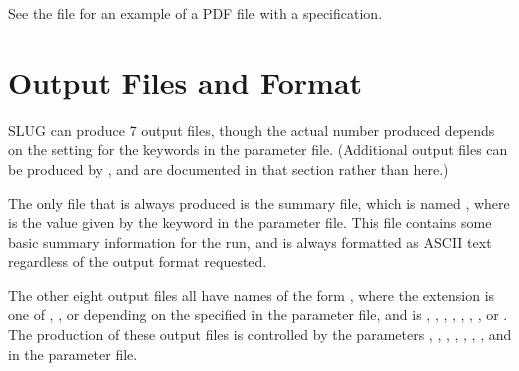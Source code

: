 \documentclass[letterpaper,10pt,english]{sphinxmanual}
\begin{document}
See the file  for an example of a PDF file with a  specification.


\chapter{Output Files and Format}
\label{\detokenize{output:output-files-and-format}}\label{\detokenize{output::doc}}\label{\detokenize{output:sec-output}}
SLUG can produce 7 output files, though the actual number produced depends on the setting for the  keywords in the parameter file. (Additional output files can be produced by {\hyperref[\detokenize{cloudy:sec-cloudy-slug}]{}}, and are documented in that section rather than here.)

The only file that is always produced is the summary file, which is named , where  is the value given by the  keyword in the parameter file. This file contains some basic summary information for the run, and is always formatted as ASCII text regardless of the output format requested.

The other eight output files all have names of the form , where the extension  is one of , , or  depending on the  specified in the parameter file, and  is , , , , , , , or . The production of these output files is controlled by the parameters , , , , , , , and  in the parameter file.
\end{document}
